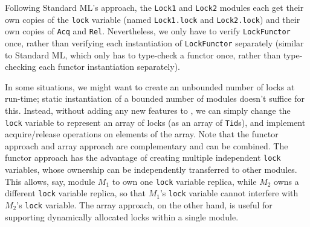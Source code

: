 Following Standard ML's approach, the \verb`Lock1` and \verb`Lock2` modules each get their own copies of the \verb`lock` variable (named \verb`Lock1.lock` and \verb`Lock2.lock`) and their own copies of \verb`Acq` and \verb`Rel`.
Nevertheless, we only have to verify \verb`LockFunctor` once, rather than verifying each instantiation of \verb`LockFunctor` separately
(similar to Standard ML, which only has to type-check a functor once, rather than type-checking each functor instantiation separately).

In some situations, we might want to create an unbounded number of locks at run-time;
static instantiation of a bounded number of modules doesn't suffice for this.
Instead, without adding any new features to \civl, we can simply change the \verb`lock` variable to represent an array of locks (as an array of \verb`Tid`s),
and implement acquire/release operations on elements of the array.
Note that the functor approach and array approach are complementary and can be combined.
The functor approach has the advantage of creating multiple independent \verb`lock` variables,
whose ownership can be independently transferred to other modules.
This allows, say, module $M_1$ to own one \verb`lock` variable replica,
while $M_2$ owns a different \verb`lock` variable replica,
so that $M_1$'s \verb`lock` variable cannot interfere with $M_2$'s \verb`lock` variable.
The array approach, on the other hand,
is useful for supporting dynamically allocated locks within a single module.
